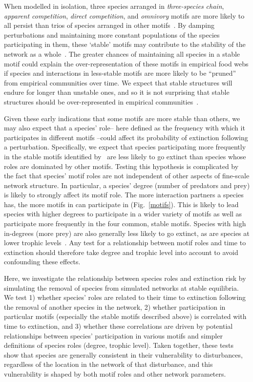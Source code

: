 \documentclass[12pt]{article}
\begin{document}
\begin{spacing}{2.0}
	When modelled in isolation, three species arranged in \emph{three-species chain}, \emph{apparent competition}, \emph{direct competition}, and \emph{omnivory} motifs are more likely to all persist than trios of species arranged in other motifs~\citep{Borrelli2015a}.
	By damping perturbations and maintaining more constant populations of the species participating in them, these `stable' motifs may contribute to the stability of the network as a whole~\citep{Borrelli2015a}. 
    The greater chances of maintaining all species in a stable motif could explain the over-representation of these motifs in empirical food webs if species and interactions in less-stable motifs are more likely to be ``pruned'' from empirical communities over time. We expect that stable structures will endure for longer than unstable ones, and so it is not surprising that stable structures should be over-represented in empirical communities~\citep{Borrelli2015}.


	Given these early indications that some motifs are more stable than others, we may also expect that a species' role-- here defined as the frequency with which it participates in different motifs --could affect its probability of extinction following a perturbation.
	Specifically, we expect that species participating more frequently in the stable motifs identified by~\citet{Borrelli2015a} are less likely to go extinct than species whose roles are dominated by other motifs.
	Testing this hypothesis is complicated by the fact that species' motif roles are not independent of other aspects of fine-scale network structure. 
    In particular, a species' degree (number of predators and prey) is likely to strongly affect its motif role.
    The more interaction partners a species has, the more motifs in can participate in (Fig.~\ref{motifs}).
    This is likely to lead species with higher degrees to participate in a wider variety of motifs as well as participate more frequently in the four common, stable motifs.
    Species with high in-degrees (more prey) are also generally less likely to go extinct, as are species at lower trophic levels~\citep{Cirtwill2018FoodWebs}.
    Any test for a relationship between motif roles and time to extinction should therefore take degree and trophic level into account to avoid confounding these effects.  
    
    
    Here, we investigate the relationship between species roles and extinction risk by simulating the removal of species from simulated networks at stable equilibria. We test 1) whether species' roles are related to their time to extinction following the removal of another species in the network, 2) whether participation in particular motifs (especially the stable motifs described above) is correlated with time to extinction, and 3) whether these correlations are driven by potential relationships between species' participation in various motifs and simpler definitions of species roles (degree, trophic level). Taken together, these tests show that species are generally consistent in their vulnerability to disturbances, regardless of the location in the network of that disturbance, and this vulnerability is shaped by both motif roles and other network parameters.



\end{spacing}
\end{document}
